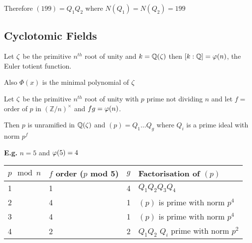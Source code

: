 \documentclass[11pt]{article}
\begin{document}
 Therefore $(199) = Q_1Q_2$ where $N(Q_1)=N(Q_2)=199$
 

\subsection{Cyclotomic Fields}
Let $\zeta$ be the primitive $n^{th}$ root of unity and $k = \mathbb{Q}(\zeta) $ then $[k:\mathbb{Q}] = \varphi(n)$, the Euler totient function.

Also $\Phi(x) $ is the minimal polynomial of $\zeta$


\begin{theorem}
	Let $\zeta$ be the primitive $n^{th}$ root of unity with $p$ prime not dividing $n$ and let $f = $ order of $p$ in $(\mathbb{Z}/n)^\times$ and $fg = \varphi(n) $.

	Then $p$ is unramified in $\mathbb{Q}(\zeta)$ and $(p) = Q_1 \dots Q_g$ where $Q_i$ is a prime ideal with norm $p^f$ 
\end{theorem}
\spa
\textbf{E.g.} $n= 5$ and $\varphi(5) = 4 $
\spac
\begin{tabular}{l|l|l|l}
	$p \mod n$ & $f$ order ($p$ mod 5) & $g$ & Factorisation of $(p)$               \\
	\hline
	1          & 1                     & 4   & $Q_1Q_2Q_3Q_4$                       \\
	2          & 4                     & 1   & $(p)$ is prime with norm $p^4$       \\
	3          & 4                     & 1   & $(p)$ is prime with norm $p^4$       \\
	4          & 2                     & 2   & $Q_1Q_2$ $Q_i$ prime with norm $p^2$
\end{tabular}
\end{document}
